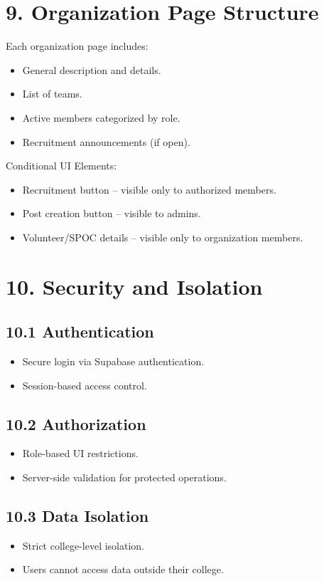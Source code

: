\documentclass[12pt]{article}
\begin{document}
\section*{9. Organization Page Structure}

Each organization page includes:
\begin{itemize}
    \item General description and details.
    \item List of teams.
    \item Active members categorized by role.
    \item Recruitment announcements (if open).
\end{itemize}

Conditional UI Elements:
\begin{itemize}
    \item Recruitment button – visible only to authorized members.
    \item Post creation button – visible to admins.
    \item Volunteer/SPOC details – visible only to organization members.
\end{itemize}

\section*{10. Security and Isolation}

\subsection*{10.1 Authentication}
\begin{itemize}
    \item Secure login via Supabase authentication.
    \item Session-based access control.
\end{itemize}

\subsection*{10.2 Authorization}
\begin{itemize}
    \item Role-based UI restrictions.
    \item Server-side validation for protected operations.
\end{itemize}

\subsection*{10.3 Data Isolation}
\begin{itemize}
    \item Strict college-level isolation.
    \item Users cannot access data outside their college.
\end{itemize}
\end{document}
